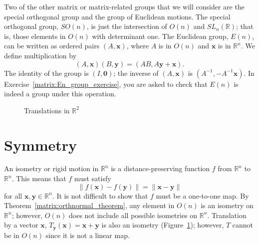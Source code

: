  
 
Two of the other matrix or matrix-related groups that we will consider
are the special orthogonal group  and the group of Euclidean motions.
The {\bfi special orthogonal group},
$SO(n)$\label{notespecialorthog}, is just the intersection of $O(n)$
and $SL_n({\mathbb R})$; that is, those elements in $O(n)$ with determinant
one. The {\bfi Euclidean
group},
$E(n)$\label{noteeuclidgroup}, can be written as ordered pairs $(A,
{\mathbf x})$, where $A$ is in $O(n)$ and ${\mathbf x}$ is in ${\mathbb
R}^n$. We define multiplication by
\[
(A, {\mathbf x}) (B, {\mathbf y})
=
(AB, A {\mathbf y} +{\mathbf x}).
\]
The identity of the group is $(I,{\mathbf 0})$; the inverse of $(A,
{\mathbf x})$ is $(A^{-1}, -A^{-1} {\mathbf x})$. In Exercise~\ref{matrix:En_group_exercise}, you 
are asked to check that $E(n)$ is indeed a group under this operation.
 
 
 
 
\begin{figure}[hbt]

\begin{center}
\end{center}
\caption{Translations in ${\mathbb R}^2$}
\label{Isometries}
\end{figure}
 
 
 
 
 
\section{Symmetry}
 
 
 
 
An {\bfi isometry\/} or {\bfi rigid
motion\/} in ${\mathbb R}^n$  is a
distance-preserving function $f$ from ${\mathbb R}^n$ to ${\mathbb R}^n$.
This means that $f$ must satisfy 
\[
\| f({\mathbf x}) - f({\mathbf y}) \| =
\|{\mathbf x} - {\mathbf y} \|
\]
for all ${\mathbf x}, {\mathbf y} \in {\mathbb R}^n$. It is not difficult to
show that $f$ must be a one-to-one map. By Theorem~\ref{matrix:orthnormal_theorem}, any element in
$O(n)$ is an isometry on ${\mathbb R}^n$; however, $O(n)$ does not
include all possible isometries on ${\mathbb R}^n$. Translation by a
vector ${\mathbf x}$, $T_{\mathbf y}({\mathbf x}) = {\mathbf x} + {\mathbf y}$
is also an isometry (Figure~\ref{Isometries}); however, $T$ cannot be
in $O(n)$ since it is not a linear map. 
 

